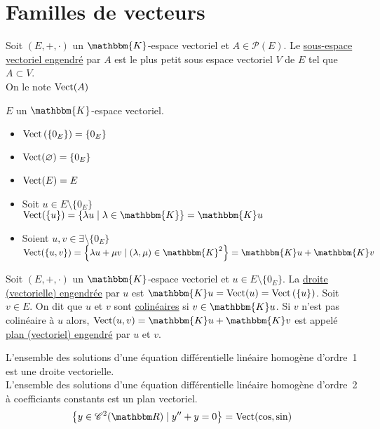 \part{Familles de vecteurs}

\begin{defn}
	Soit $(E,+,\cdot)$ un $\mathbbm{K}$-espace vectoriel et $A \in \mathcal{P}(E)$. Le \underline{sous-espace vectoriel engendré} par $A$ est le plus petit sous espace vectoriel $V$ de $E$ tel que $A \subset  V$.\\
	On le note $\operatorname{Vect}(A)$
\end{defn}

\begin{exm}
	$E$ un $\mathbbm{K}$-espace vectoriel.
	\begin{itemize}
		\item $\operatorname{Vect}\left( \left\{ 0_E \right\}  \right)  = \left\{ 0_E \right\}$ 
		\item $\operatorname{Vect}(\varnothing) = \{0_E\}$ 
		\item $\operatorname{Vect}(E) = E$ 
		\item Soit $ u \in E \setminus \{0_E\}$ \\
			$\Vect(\{u\}) = \{\lambda u  \mid  \lambda \in \mathbbm{K}\} = \mathbbm{K}u$ 
		\item Soient $u, v \in \exists \setminus \{0_E\}$\\
			$\Vect(\{u,v\}) = \left\{ \lambda u + \mu v  \mid (\lambda,\mu) \in \mathbbm{K}^2 \right\} = \mathbbm{K}u + \mathbbm{K}v $
	\end{itemize}
\end{exm}

\begin{defn}
	Soit $(E,+,\cdot)$ un $\mathbbm{K}$-espace vectoriel et $u \in E\setminus \{0_E\}$.
	La \underline{droite (vectorielle) engendrée} par $u$ est $\mathbbm{K}u = \Vect(u) = \Vect\left( \{u\}  \right)$.
	Soit $v \in E$. On dit que $u$ et $v$ sont \underline{colinéaires} si $v \in \mathbbm{K}u$.
	Si $v$ n'est pas colinéaire à $u$ alors,  $\Vect(u,v) = \mathbbm{K}u + \mathbbm{K}v$ est appelé \underline{plan (vectoriel) engendré} par $u$ et $v$.
\end{defn}

\begin{exm}
	L'ensemble des solutions d'une équation différentielle linéaire homogène d'ordre~1 est une droite vectorielle.\\[5mm]
	L'ensemble des solutions d'une équation différentielle linéaire homogène d'ordre~2 à coefficiants constants est un plan vectoriel.
	\[
		\left\{ y \in \mathcal{C}^2(\R)  \mid y'' + y = 0 \right\}  = \Vect(\cos,\sin)
	\] 
\end{exm}

